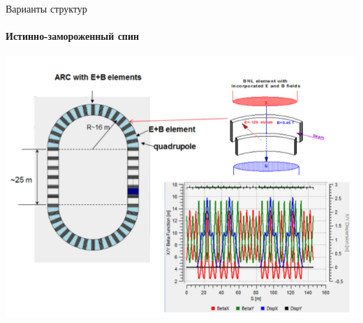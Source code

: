 \documentclass[14pt]{beamer}
\begin{document}
\begin{frame}{Варианты структур}
	\framesubtitle{Истинно-замороженный спин}
	\centering
	\includegraphics[width=.8\linewidth]{chapter2/BNL_lattice}
\end{frame}
\end{document}
